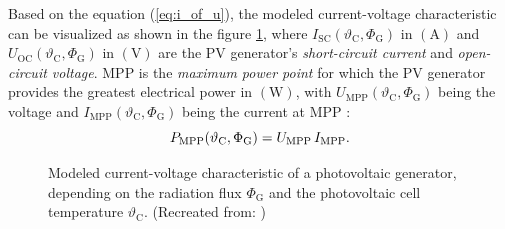 Based on the equation (\ref{eq:i_of_u}), the modeled current-voltage characteristic can be visualized as shown in the figure \ref{fig:tikz/tikz_PVG_curve}, where $I_{\mathrm{SC}}(\vartheta_{\mathrm{C}}, \Phi_{\mathrm{G}})$ in $\left( \mathrm{A} \right)$ and $U_{\mathrm{OC}}(\vartheta_{\mathrm{C}}, \Phi_{\mathrm{G}})$ in $\left( \mathrm{V} \right)$ are the PV generator's \emph{short-circuit current} and \emph{open-circuit voltage}. MPP is the \emph{maximum power point} for which the PV generator provides the greatest electrical power in $\left( \mathrm{W} \right)$, with $U_{\mathrm{MPP}}(\vartheta_{\mathrm{C}}, \Phi_{\mathrm{G}})$ being the voltage and $I_{\mathrm{MPP}}(\vartheta_{\mathrm{C}}, \Phi_{\mathrm{G}})$ being the current at MPP \cite{Prechtl:2006, Mertens:2015, Wagner:2018}:
	\begin{equation} \label{eq:p_mpp}
	\centering
		P_{\mathrm{MPP}}(\vartheta_{\mathrm{C}}, \Phi_{\mathrm{G}}) = U_{\mathrm{MPP}} \, I_{\mathrm{MPP}} \text{.}
	\end{equation}
\begin{figure}[h!]
	\centering
	
	\caption{Modeled current-voltage characteristic of a photovoltaic generator, depending on the radiation flux $\Phi_{\mathrm{G}}$ and the photovoltaic cell temperature $\vartheta_{\mathrm{C}}$. (Recreated from: \cite{Mertens:2015, Wagner:2018})}
	\label{fig:tikz/tikz_PVG_curve}
\end{figure}


